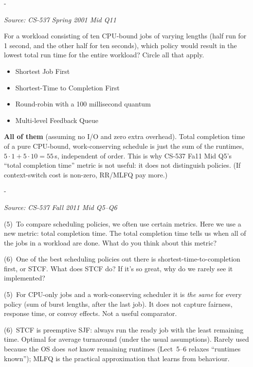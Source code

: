 \documentclass[11pt,a4paper]{article}
\makeatletter
\newcommand{\keepspace}[1]{\par\penalty-100\begingroup
  \setlength{\dimen@}{#1}\dimen@ii\pagegoal\advance\dimen@ii-\pagetotal
  \ifdim\dimen@>\dimen@ii\ifdim\dimen@ii>\z@\vfil\fi\break\fi\endgroup}
\newcounter{qn}[section]
\newenvironment{Qn}[4]{%
  \refstepcounter{qn}\keepspace{7\baselineskip}%
  \begin{tcolorbox}[qboxstyle, title={Q\thesection.\theqn\ \ [#1 \textbar\ #2]\ \ #4}]%
  {\footnotesize\color{g3}\textit{Source: #3}}\par\smallskip%
}{%
  \end{tcolorbox}%
}
\newenvironment{Sol}{%
  \begin{tcolorbox}[sboxstyle, title={Solution}]%
}{%
  \end{tcolorbox}\vspace{0.35em}%
}
\makeatother
\begin{document}
\begin{Qn}{Easy-Medium}{Lect 5--6}{CS-537 Spring 2001 Mid Q11}{Lowest \emph{total} run time of a mixed workload}
For a workload consisting of ten CPU-bound jobs of varying lengths (half run for 1 second, and the other half for ten seconds), which policy would result in the lowest total run time for the entire workload? Circle all that apply.
\begin{itemize}
  \item[(a)] Shortest Job First
  \item[(b)] Shortest-Time to Completion First
  \item[(c)] Round-robin with a 100 millisecond quantum
  \item[(d)] Multi-level Feedback Queue
\end{itemize}
\end{Qn}
\begin{Sol}
\textbf{All of them} (assuming no I/O and zero extra overhead). Total completion time of a pure CPU-bound, work-conserving schedule is just the sum of the runtimes, $5\cdot 1 + 5\cdot 10 = 55$\,s, independent of order. This is why CS-537 Fa11 Mid Q5's ``total completion time'' metric is not useful: it does not distinguish policies. (If context-switch cost is non-zero, RR/MLFQ pay more.)
\end{Sol}

\begin{Qn}{Easy-Medium}{Lect 5--6}{CS-537 Fall 2011 Mid Q5--Q6}{A useless metric, and why STCF is rarely implemented}
(5)~To compare scheduling policies, we often use certain metrics. Here we use a new metric: total completion time. The total completion time tells us when all of the jobs in a workload are done. What do you think about this metric?

(6)~One of the best scheduling policies out there is shortest-time-to-completion first, or STCF. What does STCF do? If it's so great, why do we rarely see it implemented?
\end{Qn}
\begin{Sol}
(5)~For CPU-only jobs and a work-conserving scheduler it is \emph{the same} for every policy (sum of burst lengths, after the last job). It does not capture fairness, response time, or convoy effects. Not a useful comparator.

(6)~STCF is preemptive SJF: always run the ready job with the least remaining time. Optimal for average turnaround (under the usual assumptions). Rarely used because the OS does \emph{not} know remaining runtimes (Lect~5--6 relaxes ``runtimes known''); MLFQ is the practical approximation that learns from behaviour.
\end{Sol}
\end{document}
